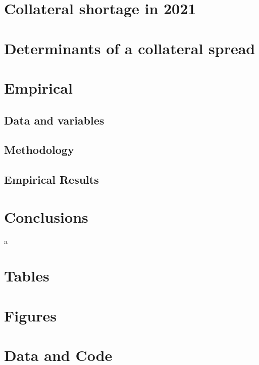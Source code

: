 \documentclass[12pt]{article}
\begin{document}
\section{Collateral shortage in 2021}

\section{Determinants of a collateral spread}

\section{Empirical}

\subsection{Data and variables}

\subsection{Methodology}

\subsection{Empirical Results}

\section{Conclusions}
a

\newpage

\begin{appendices}
   \section{Tables}
   \section{Figures}
   \section{Data and Code}
\end{appendices}
% 

\newpage 


\end{document}
